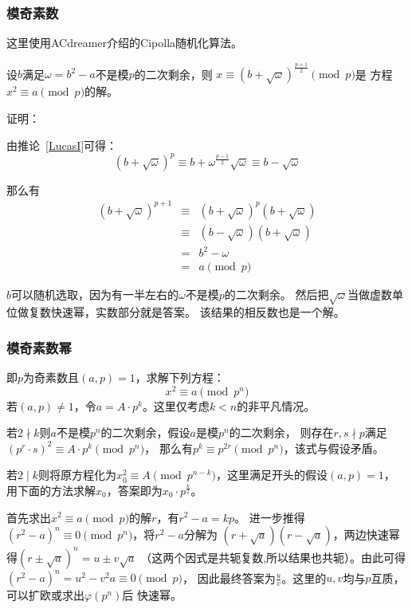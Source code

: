 \subsubsection{模奇素数}
这里使用ACdreamer介绍的Cipolla随机化算法。
\begin{theorem}
    设$b$满足$\omega=b^2-a$不是模$p$的二次剩余，则
    $x\equiv (b+\sqrt{\omega})^\frac{p+1}{2}\pmod{p}$是
    方程$x^2\equiv a\pmod{p}$的解。
\end{theorem}
证明：

由推论~\ref{LucasI}可得：
\begin{displaymath}
    (b+\sqrt{\omega})^p\equiv b+\omega^\frac{p-1}{2}\sqrt{\omega}
    \equiv b-\sqrt{\omega}
\end{displaymath}

那么有
\begin{eqnarray*}
    (b+\sqrt{\omega})^{p+1}&\equiv&(b+\sqrt{\omega})^p(b+\sqrt{\omega})\\
    &\equiv&(b-\sqrt{\omega})(b+\sqrt{\omega})\\
    &=&b^2-\omega\\
    &=&a \pmod{p}
\end{eqnarray*}

$b$可以随机选取，因为有一半左右的$\omega$不是模$p$的二次剩余。
然后把$\sqrt{\omega}$当做虚数单位做复数快速幂，实数部分就是答案。
该结果的相反数也是一个解。
\subsubsection{模奇素数幂}
即$p$为奇素数且$(a,p)=1$，求解下列方程：
\begin{displaymath}
	x^2\equiv a \pmod{p^n}
\end{displaymath}
若$(a,p)\neq 1$，令$a=A\cdot p^k$。这里仅考虑$k<n$的非平凡情况。

若$2\nmid k$则$a$不是模$p^n$的二次剩余，假设$a$是模$p^n$的二次剩余，
则存在$r,s\nmid p$满足$(p^r\cdot s)^2\equiv A\cdot p^k\pmod{p^n}$，
那么有$p^k\equiv p^{2r}\pmod{p^n}$，该式与假设矛盾。

若$2\mid k$则将原方程化为$x_0^2\equiv A \pmod{p^{n-k}}$，这里满足开头的假设$(a,p)=1$，
用下面的方法求解$x_0$，答案即为$x_0\cdot p^\frac{k}{2}$。

首先求出$x^2\equiv a \pmod{p}$的解$r$，有$r^2-a=kp$。
进一步推得$(r^2-a)^n\equiv 0 \pmod{p^n}$，将$r^2-a$分解为
$(r+\sqrt{a})(r-\sqrt{a})$，两边快速幂得$(r\pm\sqrt{a})^n=u\pm v\sqrt{a}$
（这两个因式是共轭复数,所以结果也共轭）。由此可得$(r^2-a)^n=u^2-v^2a\equiv 0\pmod{p}$，
因此最终答案为$\frac{u}{v}$。这里的$u,v$均与$p$互质，可以扩欧或求出$\varphi(p^n)$后
快速幂。
